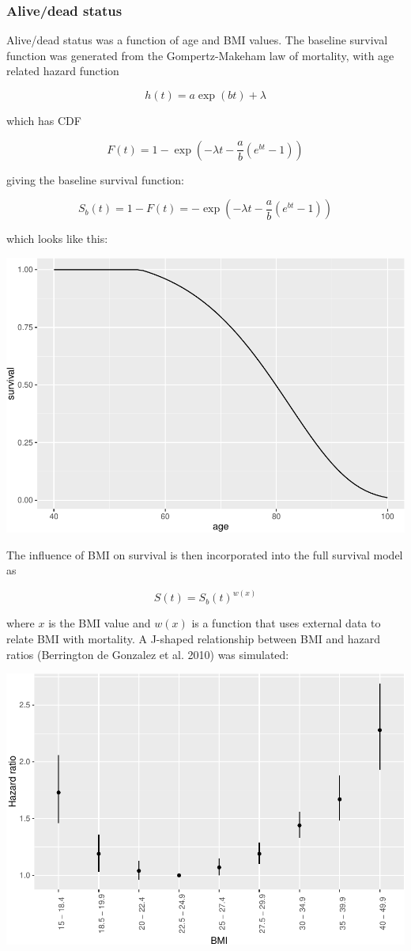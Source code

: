 \documentclass[]{article}
\begin{document}
\subsubsection{Alive/dead status}\label{alivedead-status}

Alive/dead status was a function of age and BMI values. The baseline
survival function was generated from the Gompertz-Makeham law of
mortality, with age related hazard function

\[
h(t) = a \exp(bt) + \lambda
\]

which has CDF

\[
F(t) = 1 - \exp(-\lambda t-\frac{a}{b}(e^{b t}-1))
\]

giving the baseline survival function:

\[
S_{b}(t) = 1 - F(t) = -\exp(-\lambda t-\frac{a}{b}(e^{b t}-1))
\]

which looks like this:

\includegraphics{images/baseline_gm-1.pdf}

The influence of BMI on survival is then incorporated into the full
survival model as

\[
S(t) = S_{b}(t)^{w(x)}
\]

where \(x\) is the BMI value and \(w(x)\) is a function that uses
external data to relate BMI with mortality. A J-shaped relationship
between BMI and hazard ratios ({Berrington de Gonzalez} et al. 2010) was
simulated:

\includegraphics{images/bmi_hr-1.pdf}
\end{document}
